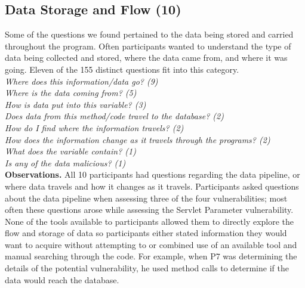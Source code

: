 \documentclass[conference]{IEEEtran}
\begin{document}



\noindent\subsection{\textbf{Data Storage and Flow (10)}}\label{dsf}

Some of the questions we found pertained to the data being stored and carried throughout the program. 
Often participants wanted to understand  the type of data being collected and stored, where the data came from, and where it was going. 
Eleven of the 155 distinct questions fit into this category.
\\

\noindent\emph{Where does this information/data go? (9)} \\
\emph{Where is the data coming from? (5)} \\
\emph{How is data put into this variable? (3)} \\
\emph{Does data from this method/code travel to the database? (2)} \\
\emph{How do I find where the information travels? (2)} \\
\emph{How does the information change as it travels through the programs? (2)} \\
\emph{What does the variable contain? (1)} \\
\emph{Is any of the data malicious? (1)} \\


\noindent\textbf{Observations.}
All 10 participants had questions regarding the data pipeline, or where data travels and how it changes as it travels.
Participants asked questions about the data pipeline when assessing three of the four vulnerabilities; most often these questions arose while assessing the Servlet Parameter vulnerability. 
None of the tools available to participants allowed them to directly explore the flow and storage of data so participants either stated information they would want to acquire without attempting to or combined use of an available tool and manual searching through the code. 
For example, when P7 was determining the details of the potential vulnerability, he used method calls to determine if the data would reach the database.
\end{document}
